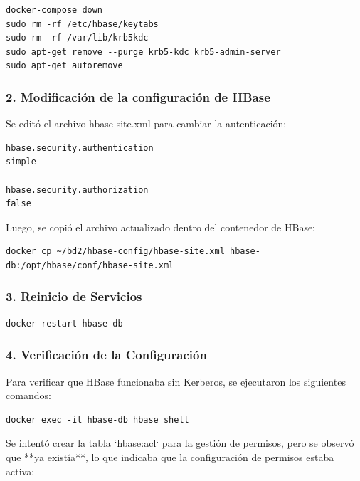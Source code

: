 \documentclass{article}
\begin{document}
\begin{lstlisting}[style=bashStyle]
docker-compose down
sudo rm -rf /etc/hbase/keytabs
sudo rm -rf /var/lib/krb5kdc
sudo apt-get remove --purge krb5-kdc krb5-admin-server
sudo apt-get autoremove
\end{lstlisting}

\newpage
\subsubsection{2. Modificación de la configuración de HBase}

Se editó el archivo hbase-site.xml para cambiar la autenticación:


\begin{verbatim}
hbase.security.authentication
simple

hbase.security.authorization
false
\end{verbatim}

Luego, se copió el archivo actualizado dentro del contenedor de HBase:

\begin{lstlisting}[style=bashStyle]
docker cp ~/bd2/hbase-config/hbase-site.xml hbase-db:/opt/hbase/conf/hbase-site.xml
\end{lstlisting}


\subsubsection{3. Reinicio de Servicios}

\begin{lstlisting}[style=bashStyle]
docker restart hbase-db
\end{lstlisting}


\subsubsection{4. Verificación de la Configuración}

Para verificar que HBase funcionaba sin Kerberos, se ejecutaron los siguientes comandos:

\begin{lstlisting}[style=bashStyle]
docker exec -it hbase-db hbase shell
\end{lstlisting}

Se intentó crear la tabla `hbase:acl` para la gestión de permisos, pero se observó que **ya existía**, lo que indicaba que la configuración de permisos estaba activa:
\end{document}
